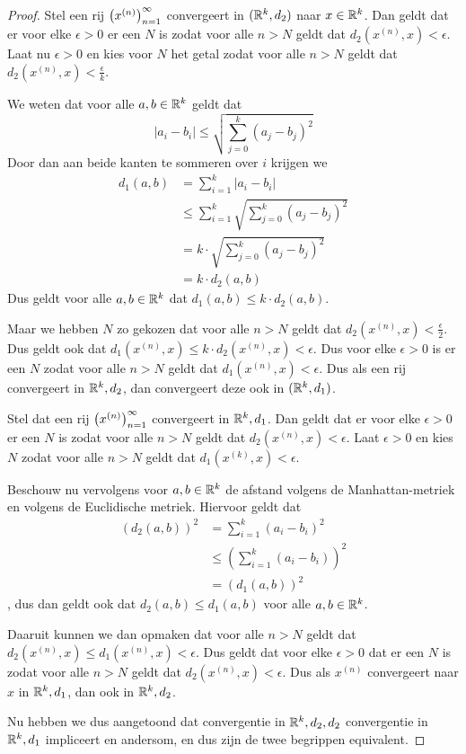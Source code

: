 \label{sec:eqeucman}
\begin{proof}
    Stel een rij \(\left(x^{(n)}\right)_{n=1}^{\infty}\) convergeert in \((\mathbb{R}^{k},d_{2})\) naar \(x\in\mathbb{R}^{k}\). Dan geldt dat er voor elke \(\epsilon>0\) er een \(N\) is zodat voor alle \(n>N\) geldt dat \(d_{2}(x^{(n)},x)<\epsilon\). Laat nu \(\epsilon>0\) en kies voor \(N\) het getal zodat voor alle \(n>N\) geldt dat \(d_{2}\left(x^{(n)},x\right)<\frac{\epsilon}{k}\).

    We weten dat voor alle \(a,b\in\mathbb{R}^{k}\) geldt dat 
    \[
        \left|a_{i}-b_{i}\right|\leq\sqrt{\sum\limits_{j=0}^{k}(a_{j}-b_{j})^{2}}
    \]
    Door dan aan beide kanten te sommeren over \(i\) krijgen we
    \begin{align*}
        d_{1}(a,b)&= \sum\limits_{i=1}^{k}\left|a_{i}-b_{i}\right|\\
        &\leq \sum\limits_{i=1}^{k}\sqrt{\sum\limits_{j=0}^{k}(a_{j}-b_{j})^{2}}\\
        &=k\cdot\sqrt{\sum\limits_{j=0}^{k}(a_{j}-b_{j})^{2}}\\
        &=k\cdot d_{2}(a,b)
    \end{align*}
    Dus geldt voor alle \(a,b\in\mathbb{R}^{k}\) dat \(d_{1}(a,b)\leq k\cdot d_{2}(a,b)\).

    Maar we hebben \(N\) zo gekozen dat voor alle \(n>N\) geldt dat \(d_{2}(x^{(n)},x)<\frac{\epsilon}{2}\). Dus geldt ook dat \(d_{1}(x^{(n)},x)\leq k\cdot d_{2}(x^{(n)},x)<\epsilon\). Dus voor elke \(\epsilon>0\) is er een \(N\) zodat voor alle \(n>N\) geldt dat \(d_{1}(x^{(n)},x)<\epsilon\). Dus als een rij convergeert in \(\mathbb{R}^{k}, d_{2}\), dan convergeert deze ook in \((\mathbb{R}^{k},d_{1})\).

    Stel dat een rij \(\left(x^{(n)}\right)_{n=1}^{\infty}\) convergeert in \(\mathbb{R}^{k},d_{1}\). Dan geldt dat er voor elke \(\epsilon>0\) er een \(N\) is zodat voor alle \(n>N\) geldt dat \(d_{2}(x^{(n)},x)<\epsilon\). Laat \(\epsilon>0\) en kies \(N\) zodat voor alle \(n>N\) geldt dat \(d_{1}(x^{(k)},x)<\epsilon\).

    Beschouw nu vervolgens voor \(a,b\in\mathbb{R}^{k}\) de afstand volgens de Manhattan-metriek en volgens de Euclidische metriek. Hiervoor geldt dat
    \begin{align*}
        \left(d_{2}(a,b)\right)^{2}& =\sum\limits_{i=1}^{k}(a_{i}-b_{i})^{2}\\
        &\leq \left(\sum\limits_{i=1}^{k}(a_{i}-b_{i})\right)^{2}\\
        &= \left(d_{1}(a,b)\right)^{2}
    \end{align*}
    , dus dan geldt ook dat \(d_{2}(a,b)\leq d_{1}(a,b)\) voor alle \(a,b\in\mathbb{R}^{k}\).

    Daaruit kunnen we dan opmaken dat voor alle \(n>N\) geldt dat \(d_{2}(x^{(n)},x)\leq d_{1}(x^{(n)},x)<\epsilon\). Dus geldt dat voor elke \(\epsilon>0\) dat er een \(N\) is zodat voor alle \(n>N\) geldt dat \(d_{2}(x^{(n)},x)<\epsilon\). Dus als \(x^{(n)}\) convergeert naar \(x\) in \(\mathbb{R}^{k},d_{1}\), dan ook in \(\mathbb{R}^{k},d_{2}\).

    Nu hebben we dus aangetoond dat convergentie in \(\mathbb{R}^{k},d_{2},d_{2}\) convergentie in \(\mathbb{R}^{k},d_{1}\) impliceert en andersom, en dus zijn de twee begrippen equivalent. 
\end{proof}
